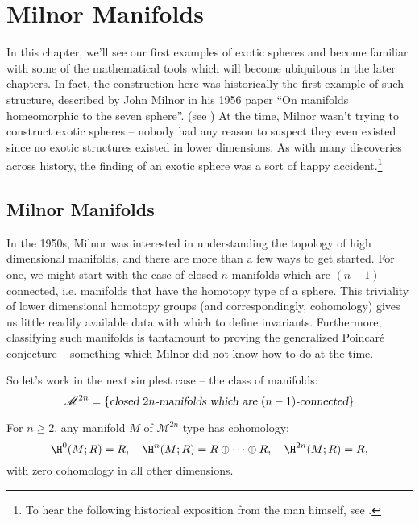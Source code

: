 \chapter{Milnor Manifolds}\label{ch:milnor}

In this chapter, we'll see our first examples of exotic spheres and become familiar with some of the mathematical tools which will become ubiquitous in the later chapters.
In fact, the construction here was historically the first example of such structure, described by John Milnor in his 1956 paper ``On manifolds homeomorphic to the seven sphere''. (see \cite{milnor1956manifolds}) At the time, Milnor wasn't trying to construct exotic spheres -- nobody had any reason to suspect they even existed since no exotic structures existed in lower dimensions. As with many discoveries across history, the finding of an exotic sphere was a sort of happy accident.\footnote{To hear the following historical exposition from the man himself, see \cite{milnor2000exotic}.}

\section{Milnor Manifolds}

In the 1950s, Milnor was interested in understanding the topology of high dimensional manifolds, and there are more than a few ways to get started. For one, we might start with the case of closed $n$-manifolds which are $(n-1)$-connected, i.e. manifolds that have the homotopy type of a sphere. This triviality of lower dimensional homotopy groups (and correspondingly, cohomology) gives us little readily available data with which to define invariants. Furthermore, classifying such manifolds is tantamount to proving the generalized Poincar\'e conjecture -- something which Milnor did not know how to do at the time.

So let's work in the next simplest case -- the class of manifolds:
\[\mathscr{M}^{2n} = \left\{\textsl{closed $2n$-manifolds which are $(n-1)$-connected}\right\}\]

\begin{proposition}
	For $n\geq 2$, any manifold $M$ of $\mathscr{M}^{2n}$ type has cohomology:
	\[
		\H^0(M; R) = R,\quad \H^n(M; R) = R\oplus \cdots \oplus R,\quad \H^{2n}(M; R)=R,
	\]
	with zero cohomology in all other dimensions.
\end{proposition}

